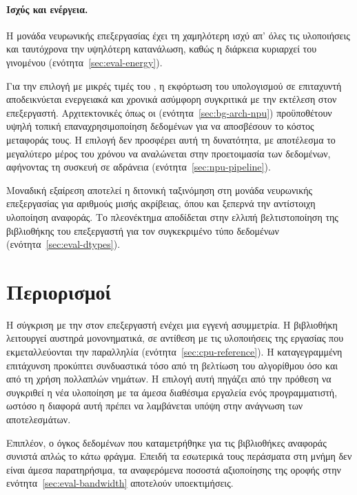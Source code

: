 \paragraph{Ισχύς και ενέργεια.} Η μονάδα νευρωνικής επεξεργασίας έχει τη
χαμηλότερη ισχύ απ' όλες τις υλοποιήσεις και ταυτόχρονα την υψηλότερη
κατανάλωση, καθώς η διάρκεια κυριαρχεί του γινομένου
(ενότητα~\ref{sec:eval-energy}).

Για την επιλογή  με μικρές τιμές του , η εκφόρτωση του
υπολογισμού σε επιταχυντή αποδεικνύεται ενεργειακά και χρονικά ασύμφορη
συγκριτικά με την εκτέλεση  στον επεξεργαστή. Αρχιτεκτονικές
όπως οι  (ενότητα~\ref{sec:bg-arch-npu}) προϋποθέτουν υψηλή τοπική
επαναχρησιμοποίηση δεδομένων για να αποσβέσουν το κόστος μεταφοράς τους. Η
επιλογή  δεν προσφέρει αυτή τη δυνατότητα, με αποτέλεσμα το
μεγαλύτερο μέρος του χρόνου να αναλώνεται στην προετοιμασία των δεδομένων,
αφήνοντας τη συσκευή σε αδράνεια (ενότητα~\ref{sec:npu-pipeline}).

Μοναδική εξαίρεση αποτελεί η διτονική ταξινόμηση στη μονάδα νευρωνικής
επεξεργασίας για αριθμούς μισής ακρίβειας, όπου και ξεπερνά την αντίστοιχη
υλοποίηση αναφοράς. Το πλεονέκτημα αποδίδεται στην ελλιπή βελτιστοποίηση της
βιβλιοθήκης του επεξεργαστή για τον συγκεκριμένο τύπο δεδομένων
(ενότητα~\ref{sec:eval-dtypes}).

\section{Περιορισμοί}
\label{sec:concl-limitations}

Η σύγκριση με την  στον επεξεργαστή ενέχει μια εγγενή
ασυμμετρία. Η βιβλιοθήκη λειτουργεί αυστηρά μονονηματικά, σε αντίθεση με τις
υλοποιήσεις της εργασίας που εκμεταλλεύονται την παραλληλία
(ενότητα~\ref{sec:cpu-reference}). Η καταγεγραμμένη επιτάχυνση προκύπτει
συνδυαστικά τόσο από τη βελτίωση του αλγορίθμου όσο και από τη χρήση πολλαπλών
νημάτων. Η επιλογή αυτή πηγάζει από την πρόθεση να συγκριθεί η νέα υλοποίηση με
τα άμεσα διαθέσιμα εργαλεία ενός προγραμματιστή, ωστόσο η διαφορά αυτή πρέπει
να λαμβάνεται υπόψη στην ανάγνωση των αποτελεσμάτων.

Επιπλέον, ο όγκος δεδομένων που καταμετρήθηκε για τις βιβλιοθήκες αναφοράς
συνιστά απλώς το κάτω φράγμα. Επειδή τα εσωτερικά τους περάσματα στη μνήμη δεν
είναι άμεσα παρατηρήσιμα, τα αναφερόμενα ποσοστά αξιοποίησης της οροφής στην
ενότητα~\ref{sec:eval-bandwidth} αποτελούν υποεκτιμήσεις.

